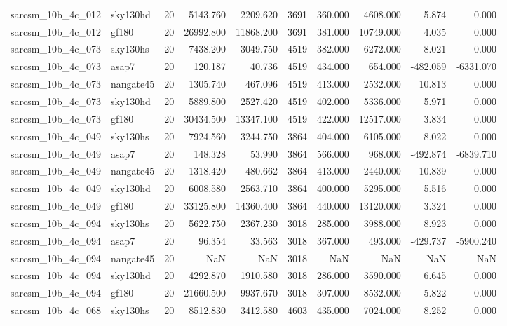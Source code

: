 \begin{longtable}{llrrrrrrrr}
sarcsm\_10b\_4c\_012 & sky130hd & 20 & 5143.760 & 2209.620 & 3691 & 360.000 & 4608.000 & 5.874 & 0.000 \\
sarcsm\_10b\_4c\_012 & gf180 & 20 & 26992.800 & 11868.200 & 3691 & 381.000 & 10749.000 & 4.035 & 0.000 \\
sarcsm\_10b\_4c\_073 & sky130hs & 20 & 7438.200 & 3049.750 & 4519 & 382.000 & 6272.000 & 8.021 & 0.000 \\
sarcsm\_10b\_4c\_073 & asap7 & 20 & 120.187 & 40.736 & 4519 & 434.000 & 654.000 & -482.059 & -6331.070 \\
sarcsm\_10b\_4c\_073 & nangate45 & 20 & 1305.740 & 467.096 & 4519 & 413.000 & 2532.000 & 10.813 & 0.000 \\
sarcsm\_10b\_4c\_073 & sky130hd & 20 & 5889.800 & 2527.420 & 4519 & 402.000 & 5336.000 & 5.971 & 0.000 \\
sarcsm\_10b\_4c\_073 & gf180 & 20 & 30434.500 & 13347.100 & 4519 & 422.000 & 12517.000 & 3.834 & 0.000 \\
sarcsm\_10b\_4c\_049 & sky130hs & 20 & 7924.560 & 3244.750 & 3864 & 404.000 & 6105.000 & 8.022 & 0.000 \\
sarcsm\_10b\_4c\_049 & asap7 & 20 & 148.328 & 53.990 & 3864 & 566.000 & 968.000 & -492.874 & -6839.710 \\
sarcsm\_10b\_4c\_049 & nangate45 & 20 & 1318.420 & 480.662 & 3864 & 413.000 & 2440.000 & 10.839 & 0.000 \\
sarcsm\_10b\_4c\_049 & sky130hd & 20 & 6008.580 & 2563.710 & 3864 & 400.000 & 5295.000 & 5.516 & 0.000 \\
sarcsm\_10b\_4c\_049 & gf180 & 20 & 33125.800 & 14360.400 & 3864 & 440.000 & 13120.000 & 3.324 & 0.000 \\
sarcsm\_10b\_4c\_094 & sky130hs & 20 & 5622.750 & 2367.230 & 3018 & 285.000 & 3988.000 & 8.923 & 0.000 \\
sarcsm\_10b\_4c\_094 & asap7 & 20 & 96.354 & 33.563 & 3018 & 367.000 & 493.000 & -429.737 & -5900.240 \\
sarcsm\_10b\_4c\_094 & nangate45 & 20 & NaN & NaN & 3018 & NaN & NaN & NaN & NaN \\
sarcsm\_10b\_4c\_094 & sky130hd & 20 & 4292.870 & 1910.580 & 3018 & 286.000 & 3590.000 & 6.645 & 0.000 \\
sarcsm\_10b\_4c\_094 & gf180 & 20 & 21660.500 & 9937.670 & 3018 & 307.000 & 8532.000 & 5.822 & 0.000 \\
sarcsm\_10b\_4c\_068 & sky130hs & 20 & 8512.830 & 3412.580 & 4603 & 435.000 & 7024.000 & 8.252 & 0.000 \\

\end{longtable}
